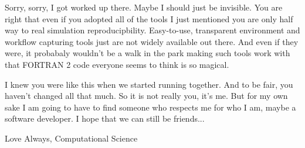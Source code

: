 \documentclass[final,10pt]{elsarticle}
\begin{document}
Sorry, sorry, I got worked up there.  Maybe I should just be invisible.  You are 
right that even if you adopted all of the tools I just mentioned you are only
half way to real simulation reproducipbility.  Easy-to-use, transparent environment
and workflow capturing tools just are not widely available out there.  And even if
they were, it probabaly wouldn't be a walk in the park making such tools work with
that FORTRAN 2 code everyone seems to think is so magical.   

I knew you were like this when we started running together.  And to be fair, you 
haven't changed all that much.  So it is not really you, it's me. But for my own sake 
I am going to have to find someone who respects me for who I am, maybe 
a software developer.  I hope that we can still be friends...

Love Always, Computational Science



%
\end{document}
